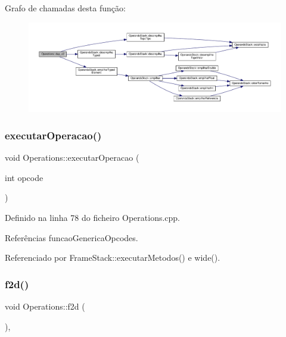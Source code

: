 Grafo de chamadas desta função\+:
\nopagebreak
\begin{figure}[H]
\begin{center}
\leavevmode
\includegraphics[width=350pt]{classOperations_adbba871c60bfb34344f2012936beeb25_cgraph}
\end{center}
\end{figure}
\mbox{\label{classOperations_ab63307824c7d6412e0afb1d037b995f1}} 
\subsubsection{\texorpdfstring{executar\+Operacao()}{executarOperacao()}}
{\footnotesize\ttfamily void Operations\+::executar\+Operacao (\begin{DoxyParamCaption}\item[{int}]{opcode }\end{DoxyParamCaption})\hspace{0.3cm}{\ttfamily [static]}}



Definido na linha 78 do ficheiro Operations.\+cpp.



Referências funcao\+Generica\+Opcodes.



Referenciado por Frame\+Stack\+::executar\+Metodos() e wide().

\mbox{\label{classOperations_afb29ca09bc75d3342920b1509aba3635}} 
\subsubsection{\texorpdfstring{f2d()}{f2d()}}
{\footnotesize\ttfamily void Operations\+::f2d (\begin{DoxyParamCaption}{ }\end{DoxyParamCaption})\hspace{0.3cm}{\ttfamily [static]}, {\ttfamily [private]}}




